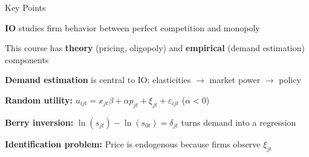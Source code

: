 \documentclass[notes,11pt, aspectratio=169]{beamer}
\newenvironment{wideenumerate}{\enumerate\addtolength{\itemsep}{10pt}}{\endenumerate}
\begin{document}
\begin{frame}{Key Points}
	\vspace{11pt}
	\begin{wideenumerate}
		\item \textbf{IO} studies firm behavior between perfect competition and monopoly
		\item This course has \textbf{theory} (pricing, oligopoly) and \textbf{empirical} (demand estimation) components
		\item \textbf{Demand estimation} is central to IO: elasticities $\rightarrow$ market power $\rightarrow$ policy
		\item \textbf{Random utility:} $u_{ijt} = x_{jt} \beta + \alpha p_{jt} + \xi_{jt} + \varepsilon_{ijt}$ \quad ($\alpha < 0$)
		\item \textbf{Berry inversion:} $\ln(s_{jt}) - \ln(s_{0t}) = \delta_{jt}$ turns demand into a regression
		\item \textbf{Identification problem:} Price is endogenous because firms observe $\xi_{jt}$
	\end{wideenumerate}
\end{frame}
\end{document}
